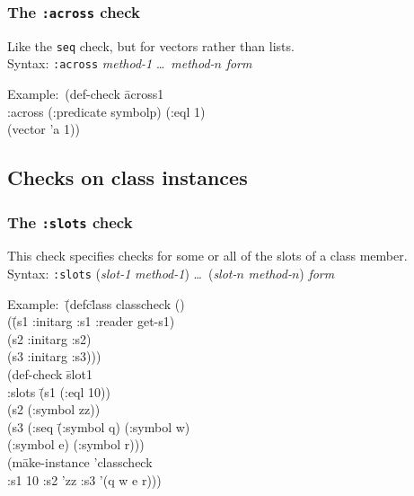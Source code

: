 \documentclass{article}
\begin{document}
\subsubsection{The \texttt{:across} check} 
Like the \texttt{seq} check, but for vectors rather than
lists.
\\ Syntax: \texttt{:across} \textit{method-1} \ldots\ \textit{method-$n$} \textit{form}
{\ttfamily\begin{tabbing}
\textrm{Example:}\ (def-check \=across1
\\ \>  :across (:predicate symbolp) (:eql 1)
\\ \>  (vector 'a 1))
\end{tabbing}}

\subsection{Checks on class instances}
\subsubsection{The \texttt{:slots} check} 
This check specifies checks for some or all of the slots of a class
member.
\\ Syntax: \texttt{:slots} (\textit{slot-1} \textit{method-1})  \ldots\ (\textit{slot-$n$} \textit{method-$n$}) \textit{form}
{\ttfamily\begin{tabbing}
\textrm{Example:}\ \= (defc\=lass classcheck ()
\\ \> \> (\=(s1 :initarg :s1 :reader get-s1)
\\ \> \> \> (s2 :initarg :s2)
\\ \> \> \> (s3 :initarg :s3)))
\\ \> (def-check \=slot1
\\ \> \>  :slots \=(s1 (:eql 10))
\\ \> \>  \>(s2 (:symbol zz))
\\ \> \>  \>(s3 (:seq \=(:symbol q) (:symbol w)
\\ \> \>  \> \> (:symbol e) (:symbol r)))
\\ \> \>  (m\=ake-instance 'classcheck
\\ \> \> \>  :s1 10 :s2 'zz :s3 '(q w e r)))
\end{tabbing}}
\end{document}

